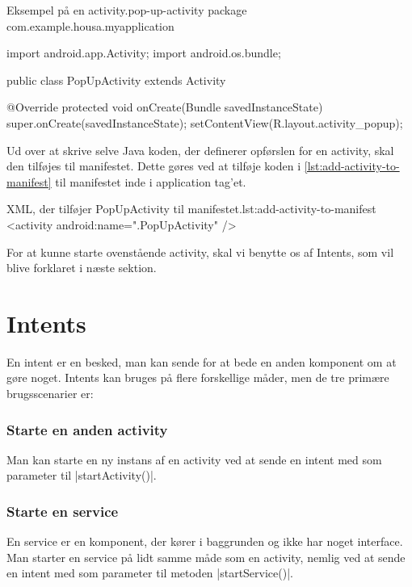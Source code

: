 \begin{JavaCode}{Eksempel på en activity.}{pop-up-activity}
	package com.example.housa.myapplication
	
	import android.app.Activity;
	import android.os.bundle;
	
	public class PopUpActivity extends Activity {
 
 @Override
 protected void onCreate(Bundle savedInstanceState) {
  super.onCreate(savedInstanceState);
  setContentView(R.layout.activity_popup);
 }
	}
\end{JavaCode}

Ud over at skrive selve Java koden, der definerer opførslen for en activity, skal den tilføjes til manifestet. Dette gøres ved at tilføje koden i \autoref{lst:add-activity-to-manifest} til manifestet inde i application tag'et.

\begin{XmlCode}{XML, der tilføjer PopUpActivity til manifestet.}{lst:add-activity-to-manifest}
	<activity android:name=".PopUpActivity" />
\end{XmlCode}

For at kunne starte ovenstående activity, skal vi benytte os af Intents, som vil blive forklaret i næste sektion.


\section{Intents}

En intent er en besked, man kan sende for at bede en anden komponent om at gøre noget. Intents kan bruges på flere forskellige måder, men de tre primære brugsscenarier er:

\subsubsection{Starte en anden activity}

Man kan starte en ny instans af en activity ved at sende en intent med som parameter til \JavaInline|startActivity()|. 

\subsubsection{Starte en service}

En service er en komponent, der kører i baggrunden og ikke har noget interface. Man starter en service på lidt samme måde som en activity, nemlig ved at sende en intent med som parameter til metoden \JavaInline|startService()|.

